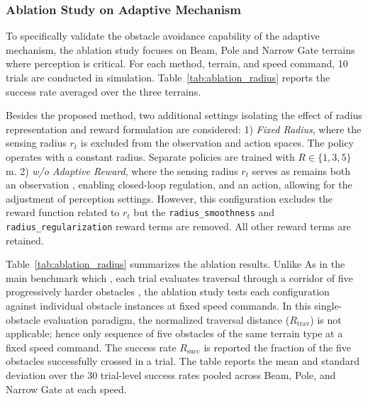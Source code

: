 \documentclass[letterpaper, 10 pt, conference]{ieeeconf/ieeeconf}
\providecommand{\DIFadd}[1]{{\protect\color{blue} \sf #1}} %
\providecommand{\DIFdel}[1]{{\protect\color{red} \scriptsize #1}} %
\providecommand{\DIFaddbegin}{} %
\providecommand{\DIFaddend}{} %
\providecommand{\DIFdelbegin}{} %
\providecommand{\DIFdelend}{} %
\begin{document}
\subsubsection{Ablation Study on Adaptive Mechanism}
To specifically validate the obstacle avoidance capability of the adaptive mechanism, the ablation study focuses on Beam, Pole and Narrow Gate terrains where perception is critical. \DIFaddbegin \DIFadd{For each method, terrain, and speed command, 10 trials are conducted in simulation. Table~\ref{tab:ablation_radius} reports the success rate averaged over the three terrains.
}

\DIFaddend Besides the proposed method, two additional settings isolating the effect of radius representation and reward formulation are considered:
1) \textit{Fixed Radius}, where the sensing radius $r_t$ is excluded from the observation and action spaces. The policy operates with a constant radius. Separate policies are trained with $R \in \{1, 3, 5\}$\,m.
2) \textit{w/o Adaptive Reward}, where \DIFdelbegin \DIFdel{the sensing radius }\DIFdelend $r_t$ \DIFdelbegin \DIFdel{serves as }\DIFdelend \DIFaddbegin \DIFadd{remains }\DIFaddend both an observation \DIFdelbegin \DIFdel{, enabling closed-loop regulation, }\DIFdelend and an action, \DIFdelbegin \DIFdel{allowing for the adjustment of perception settings. However, this configuration excludes the reward function related to $r_t$}\DIFdelend \DIFaddbegin \DIFadd{but the \texttt{radius\_smoothness} and \texttt{radius\_regularization} reward terms are removed. All other reward terms are retained}\DIFaddend .

Table~\ref{tab:ablation_radius} summarizes the ablation results. \DIFdelbegin \DIFdel{Unlike }\DIFdelend \DIFaddbegin \DIFadd{As in }\DIFaddend the main benchmark\DIFdelbegin \DIFdel{which }\DIFdelend \DIFaddbegin \DIFadd{, each trial }\DIFaddend evaluates traversal through a \DIFdelbegin \DIFdel{corridor of five progressively harder obstacles , the ablation study tests each configuration against individual obstacle instances at fixed speed commands. In this single-obstacle evaluation paradigm, the normalized traversal distance ($R_{\mathrm{trav}}$) is not applicable; hence only }\DIFdelend \DIFaddbegin \DIFadd{sequence of five obstacles of the same terrain type at a fixed speed command. The success rate }\DIFaddend $R_{\mathrm{succ}}$ is \DIFdelbegin \DIFdel{reported}\DIFdelend \DIFaddbegin \DIFadd{the fraction of the five obstacles successfully crossed in a trial. The table reports the mean and standard deviation over the 30 trial-level success rates pooled across Beam, Pole, and Narrow Gate at each speed}\DIFaddend .
\end{document}
